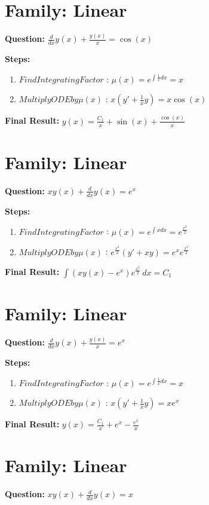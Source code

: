 \documentclass{article}
\begin{document}
\section*{Family: Linear}
\textbf{Question:} $\frac{d}{d x} y{\left(x \right)} + \frac{y{\left(x \right)}}{x} = \cos{\left(x \right)}$

\textbf{Steps:}
\begin{enumerate}
\item $Find Integrating Factor$ :  $\mu(x) = e^{\int \frac{1}{x} dx} = x$
\item $Multiply ODE by \mu(x)$ :  $x(y' + \frac{1}{x}y) = x \cos{\left(x \right)}$
\end{enumerate}
\textbf{Final Result:} $y{\left(x \right)} = \frac{C_{1}}{x} + \sin{\left(x \right)} + \frac{\cos{\left(x \right)}}{x}$

\section*{Family: Linear}
\textbf{Question:} $x y{\left(x \right)} + \frac{d}{d x} y{\left(x \right)} = e^{x}$

\textbf{Steps:}
\begin{enumerate}
\item $Find Integrating Factor$ :  $\mu(x) = e^{\int x dx} = e^{\frac{x^{2}}{2}}$
\item $Multiply ODE by \mu(x)$ :  $e^{\frac{x^{2}}{2}}(y' + xy) = e^{x} e^{\frac{x^{2}}{2}}$
\end{enumerate}
\textbf{Final Result:} $\int \left(x y{\left(x \right)} - e^{x}\right) e^{\frac{x^{2}}{2}}\, dx = C_{1}$

\section*{Family: Linear}
\textbf{Question:} $\frac{d}{d x} y{\left(x \right)} + \frac{y{\left(x \right)}}{x} = e^{x}$

\textbf{Steps:}
\begin{enumerate}
\item $Find Integrating Factor$ :  $\mu(x) = e^{\int \frac{1}{x} dx} = x$
\item $Multiply ODE by \mu(x)$ :  $x(y' + \frac{1}{x}y) = x e^{x}$
\end{enumerate}
\textbf{Final Result:} $y{\left(x \right)} = \frac{C_{1}}{x} + e^{x} - \frac{e^{x}}{x}$

\section*{Family: Linear}
\textbf{Question:} $x y{\left(x \right)} + \frac{d}{d x} y{\left(x \right)} = x$
\end{document}
